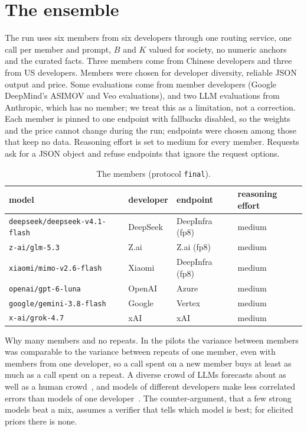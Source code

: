 \documentclass{article}
\begin{document}
\FloatBarrier
\section{The ensemble}
\label{sec:final}

The run uses six members from six developers through one routing service, one call per member and prompt, $B$ and $K$ valued for society, no numeric anchors and the curated facts. Three members come from Chinese developers and three from US developers. Members were chosen for developer diversity, reliable JSON output and price. Some evaluations come from member developers (Google DeepMind's ASIMOV and Veo evaluations), and two LLM evaluations from Anthropic, which has no member; we treat this as a limitation, not a correction. Each member is pinned to one endpoint with fallbacks disabled, so the weights and the price cannot change during the run; endpoints were chosen among those that keep no data. Reasoning effort is set to medium for every member. Requests ask for a JSON object and refuse endpoints that ignore the request options.

\begin{table}[!htbp]
  \centering\footnotesize
  \caption{The members (protocol \texttt{final}).}
  \label{tab:final}
  \begin{tabular}{@{}llll@{}}
    \toprule
    model & developer & endpoint & reasoning effort\\
    \midrule
    \texttt{deepseek/deepseek-v4.1-flash} & DeepSeek & DeepInfra (fp8) & medium\\
    \texttt{z-ai/glm-5.3} & Z.ai & Z.ai (fp8) & medium\\
    \texttt{xiaomi/mimo-v2.6-flash} & Xiaomi & DeepInfra (fp8) & medium\\
    \texttt{openai/gpt-6-luna} & OpenAI & Azure & medium\\
    \texttt{google/gemini-3.8-flash} & Google & Vertex & medium\\
    \texttt{x-ai/grok-4.7} & xAI & xAI & medium\\
    \bottomrule
  \end{tabular}
\end{table}

Why many members and no repeats. In the pilots the variance between members was comparable to the variance between repeats of one member, even with members from one developer, so a call spent on a new member buys at least as much as a call spent on a repeat. A diverse crowd of LLMs forecasts about as well as a human crowd~\citep{schoenegger2024wisdom}, and models of different developers make less correlated errors than models of one developer~\citep{kim2025correlated}. The counter-argument, that a few strong models beat a mix, assumes a verifier that tells which model is best; for elicited priors there is none.
\end{document}
